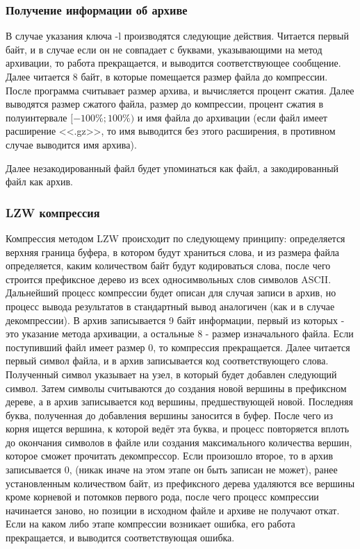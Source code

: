 \documentclass[12pt]{article}
\begin{document}
\subsubsection*{Получение информации об архиве}

В случае указания ключа -l производятся следующие действия. Читается первый байт, и в случае если он не совпадает с буквами, указывающими на метод архивации, то работа прекращается, и выводится соответствующее сообщение. Далее читается 8 байт, в которые помещается размер файла до компрессии. После программа считывает размер архива, и вычисляется процент сжатия. Далее выводятся размер сжатого файла, размер до компрессии, процент сжатия в полуинтервале $[-100\%; 100\%)$ и имя файла до архивации (если файл имеет расширение <<.gz>>, то имя выводится без этого расширения, в противном случае выводится имя архива).

Далее незакодированный файл будет упоминаться как файл, а закодированный файл как архив.%

\subsubsection*{LZW компрессия}

Компрессия методом LZW происходит по следующему принципу: определяется верхняя граница буфера, в котором будут храниться слова, и из размера файла определяется, каким количеством байт будут кодироваться слова, после чего строится префиксное дерево из всех односимвольных слов  символов ASCII. Дальнейший процесс компрессии будет описан для случая записи в архив, но процесс вывода результатов в стандартный вывод аналогичен (как и в случае декомпрессии). В архив записывается 9 байт информации, первый из которых - это указание метода архивации, а остальные 8 - размер изначального файла. Если поступивший файл имеет размер $0$, то компрессия прекращается. Далее читается первый символ файла, и в архив записывается код соответствующего слова. Полученный символ указывает на узел, в который будет добавлен следующий символ. Затем символы считываются до создания новой вершины в префиксном дереве, а в архив записывается код вершины, предшествующей новой. Последняя буква, полученная до добавления вершины заносится в буфер. После чего из корня ищется вершина, к которой ведёт эта буква, и процесс повторяется вплоть до окончания символов в файле или создания максимального количества вершин, которое сможет прочитать декомпрессор. Если произошло второе, то в архив записывается $0$, (никак иначе на этом этапе он быть записан не может), ранее установленным количеством байт, из префиксного дерева удаляются все вершины кроме корневой и потомков первого рода, после чего процесс компрессии начинается заново, но позиции в исходном файле и архиве не получают откат. Если на каком либо этапе компрессии возникает ошибка, его работа прекращается, и выводится соответствующая ошибка.
\end{document}
